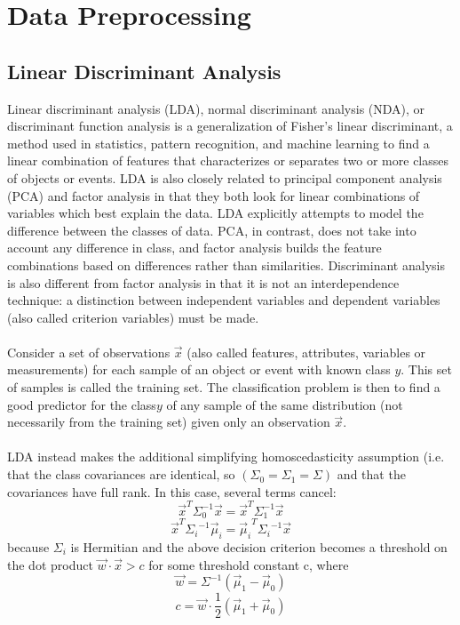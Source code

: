 \documentclass[12pt, a4paper]{report}
\begin{document}
\section{Data Preprocessing}

\subsection{Linear Discriminant Analysis}
Linear discriminant analysis (LDA), normal discriminant analysis (NDA), or discriminant function analysis is a generalization of Fisher's linear discriminant, a method used in statistics, pattern recognition, and machine learning to find a linear combination of features that characterizes or separates two or more classes of objects or events. LDA is also closely related to principal component analysis (PCA) and factor analysis in that they both look for linear combinations of variables which best explain the data. LDA explicitly attempts to model the difference between the classes of data. PCA, in contrast, does not take into account any difference in class, and factor analysis builds the feature combinations based on differences rather than similarities. Discriminant analysis is also different from factor analysis in that it is not an interdependence technique: a distinction between independent variables and dependent variables (also called criterion variables) must be made.
\paragraph{}
Consider a set of observations ${\vec {x}}$ (also called features, attributes, variables or measurements) for each sample of an object or event with known class $y$. This set of samples is called the training set. The classification problem is then to find a good predictor for the class$y$ of any sample of the same distribution (not necessarily from the training set) given only an observation ${\vec {x}}$.
\paragraph{}
LDA instead makes the additional simplifying homoscedasticity assumption (i.e. that the class covariances are identical, so  $(\Sigma _{0}=\Sigma _{1}=\Sigma )$ and that the covariances have full rank. In this case, several terms cancel:
$${\vec {x}}^{T}\Sigma _{0}^{-1}{\vec {x}}={\vec {x}}^{T}\Sigma _{1}^{-1}{\vec {x}}$$
$${\displaystyle {\vec {x}}^{T}{\Sigma _{i}}^{-1}{\vec {\mu }}_{i}={{\vec {\mu }}_{i}}^{T}{\Sigma _{i}}^{-1}{\vec {x}}}$$ because $\Sigma _{i}$ is Hermitian
and the above decision criterion becomes a threshold on the dot product ${\vec {w}}\cdot {\vec {x}}>c$ for some threshold constant c, where
$${\vec {w}}=\Sigma ^{-1}({\vec {\mu }}_{1}-{\vec {\mu }}_{0})$$
$${\displaystyle c={\vec {w}}\cdot {\frac {1}{2}}({\vec {\mu }}_{1}+{\vec {\mu }}_{0})}$$
\end{document}

